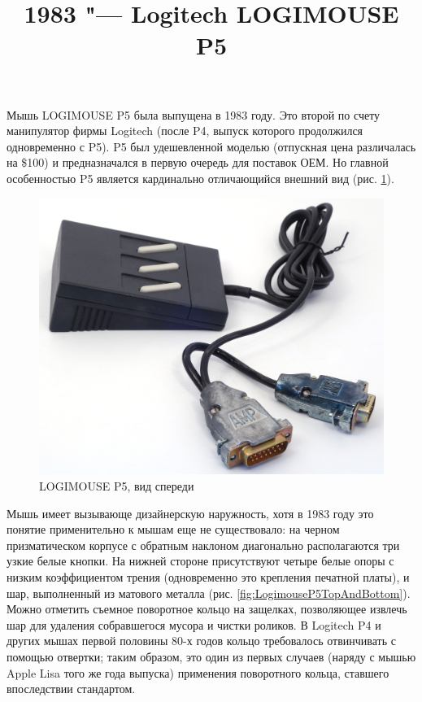 \documentclass[11pt, a4paper]{article}
\begin{document}
\title{1983 "--- Logitech LOGIMOUSE P5}
\date{}
\maketitle

Мышь LOGIMOUSE P5 была выпущена в 1983 году. Это второй по счету манипулятор фирмы Logitech (после P4, выпуск которого продолжился одновременно с P5). P5 был удешевленной моделью (отпускная цена различалась на \$100) и предназначался в первую очередь для поставок ОЕМ.
Но главной особенностью P5 является кардинально отличающийся внешний вид (рис. \ref{fig:LogimouseP5Pic}). 

\begin{figure}[h]
   \centering
    \includegraphics[scale=0.35]{1983_logitech_logimouse_p5/pic_30.jpg}
    \caption{LOGIMOUSE P5, вид спереди}
    \label{fig:LogimouseP5Pic}
\end{figure}

Мышь имеет вызывающе дизайнерскую наружность, хотя в 1983 году это понятие применительно к мышам еще не существовало: на черном призматическом корпусе с обратным наклоном диагонально располагаются три узкие белые кнопки. На нижней стороне присутствуют четыре белые опоры с низким коэффициентом трения (одновременно это крепления печатной платы), и шар, выполненный из матового металла (рис. \ref{fig:LogimouseP5TopAndBottom}). Можно отметить съемное поворотное кольцо на защелках, позволяющее извлечь шар для удаления собравшегося мусора и чистки роликов. В Logitech P4 и других мышах первой половины 80-х годов кольцо требовалось отвинчивать с помощью отвертки; таким образом, это один из первых случаев (наряду с мышью Apple Lisa того же года выпуска) применения поворотного кольца, ставшего впоследствии стандартом.
\end{document}
